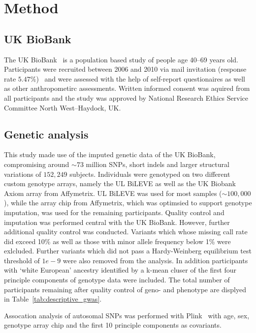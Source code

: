 \section*{Method}
\label{sec:method}

\subsection*{UK BioBank}
\label{sub:uk_biobank}
The UK BioBank~\cite{Allen2014} is a population based study of people age 40--69 years old. 
Participants were recruited between 2006 and 2010 via mail invitation (response rate $5.47\%$)~\cite{Sudlow2015} and were assessed with the help of self-report questionaires as well as other anthropometirc assessments.
Written informed consent was aquired from all participants and the study was approved by National Research Ethics Service Committee North West–Haydock, UK\@.

\subsection*{Genetic analysis}
\label{sub:genetic_analysis}
This study made use of the imputed genetic data of the UK BioBank, compromising around $\sim73$ million SNPs, short indels and larger structural variations of $152,249$ subjects.
Individuals were genotyped on two different custom genotype arrays, namely the UL BiLEVE as well as the UK Biobank Axiom array from Affymetrix. 
UL BiLEVE was used for most samples ($\sim100,000$), while the array chip from Affymetrix, which was optimsied to support genotype imputation, was used for the remaining participants. 
Quality control and imputation was performed central with the UK BioBank.
However, further additional quality control was conducted.
Variants which whose missing call rate did exceed 10\% as well as those with minor allele frequency below 1\% were exlcluded.
Further variants which did not pass a Hardy-Weinberg equilibrium test threshold of $1e-9$ were also removed from the analysis.
In addition participants with `white European' ancestry identified by a k-mean cluser of the first four principle components of genotype data were included.
The total number of participants remaining after quality control of geno- and phenotype are displyed in Table~\ref{tab:descriptive_gwas}.

Assocation analysis of autosomal SNPs was performed with Plink~\cite{Purcell2007,Chang2015} with age, sex, genotype array chip and the first 10 principle components as covariants.

